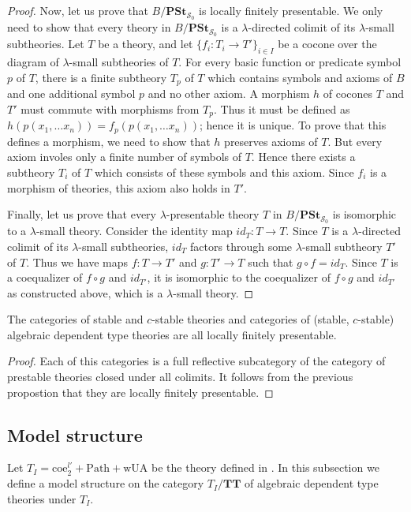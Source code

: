 \documentclass[reqno]{amsart}
\theoremstyle{definition}
\theoremstyle{remark}
\newcommand{\cat}[1]{\mathbf{#1}}
\newcommand{\PSt}{\cat{PSt}}
\newcommand{\algtt}{\cat{TT}}
\newcommand{\wUA}{\mathrm{wUA}}
\newcommand{\coeT}{\mathrm{coe}}
\newcommand{\PathT}{\mathrm{Path}}
\numberwithin{figure}{section}
\begin{document}
\begin{proof}
Now, let us prove that $B/\PSt_{\mathcal{S}_0}$ is locally finitely presentable.
We only need to show that every theory in $B/\PSt_{\mathcal{S}_0}$ is a $\lambda$-directed colimit of its $\lambda$-small subtheories.
Let $T$ be a theory, and let $\{ f_i : T_i \to T' \}_{i \in I}$ be a cocone over the diagram of $\lambda$-small subtheories of $T$.
For every basic function or predicate symbol $p$ of $T$,
there is a finite subtheory $T_p$ of $T$ which contains symbols and axioms of $B$ and one additional symbol $p$ and no other axiom.
A morphism $h$ of cocones $T$ and $T'$ must commute with morphisms from $T_p$.
Thus it must be defined as $h(p(x_1, \ldots x_n)) = f_p(p(x_1, \ldots x_n))$; hence it is unique.
To prove that this defines a morphism, we need to show that $h$ preserves axioms of $T$.
But every axiom involes only a finite number of symbols of $T$.
Hence there exists a subtheory $T_i$ of $T$ which consists of these symbols and this axiom.
Since $f_i$ is a morphism of theories, this axiom also holds in $T'$.

Finally, let us prove that every $\lambda$-presentable theory $T$ in $B/\PSt_{\mathcal{S}_0}$ is isomorphic to a $\lambda$-small theory.
Consider the identity map $id_T : T \to T$.
Since $T$ is a $\lambda$-directed colimit of its $\lambda$-small subtheories, $id_T$ factors through some $\lambda$-small subtheory $T'$ of $T$.
Thus we have maps $f : T \to T'$ and $g : T' \to T$ such that $g \circ f = id_T$.
Since $T$ is a coequalizer of $f \circ g$ and $id_{T'}$, it is isomorphic to the coequalizer of $f \circ g$ and $id_{T'}$ as constructed above, which is a $\lambda$-small theory.
\end{proof}

\begin{cor}
The categories of stable and $c$-stable theories and categories of (stable, $c$-stable) algebraic dependent type theories are all locally finitely presentable.
\end{cor}
\begin{proof}
Each of this categories is a full reflective subcategory of the category of prestable theories closed under all colimits.
It follows from the previous propostion that they are locally finitely presentable.
\end{proof}

\subsection{Model structure}

Let $T_I = \coeT^{l'}_2 + \PathT + \wUA$ be the theory defined in \cite{alg-models}.
In this subsection we define a model structure on the category $T_I/\algtt$ of algebraic dependent type theories under $T_I$.
\end{document}
